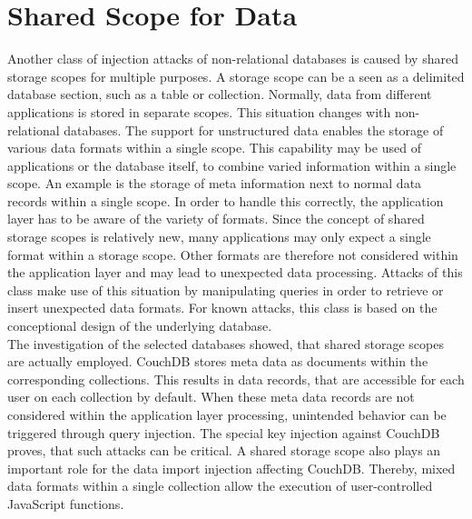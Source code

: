 \section{Shared Scope for Data}
Another class of injection attacks of non-relational databases is caused by shared storage scopes for multiple purposes. A storage scope can be a seen as a delimited database section, such as a table or collection. Normally, data from different applications is stored in separate scopes. This situation changes with non-relational databases. The support for unstructured data enables the storage of various data formats within a single scope. This capability may be used of applications or the database itself, to combine varied information within a single scope. An example is the storage of meta information next to normal data records within a single scope. In order to handle this correctly, the application layer has to be aware of the variety of formats. Since the concept of shared storage scopes is relatively new, many applications may only expect a single format within a storage scope. Other formats are therefore not considered within the application layer and may lead to unexpected data processing. Attacks of this class make use of this situation by manipulating queries in order to retrieve or insert unexpected data formats. For known attacks, this class is based on the conceptional design of the underlying database. \\

The investigation of the selected databases showed, that shared storage scopes are actually employed. CouchDB stores meta data as documents within the corresponding collections. This results in data records, that are accessible for each user on each collection by default. When these meta data records are not considered within the application layer processing, unintended behavior can be triggered through query injection. The special key injection against CouchDB proves, that such attacks can be critical. A shared storage scope also plays an important role for the data import injection affecting CouchDB. Thereby, mixed data formats within a single collection allow the execution of user-controlled JavaScript functions.

